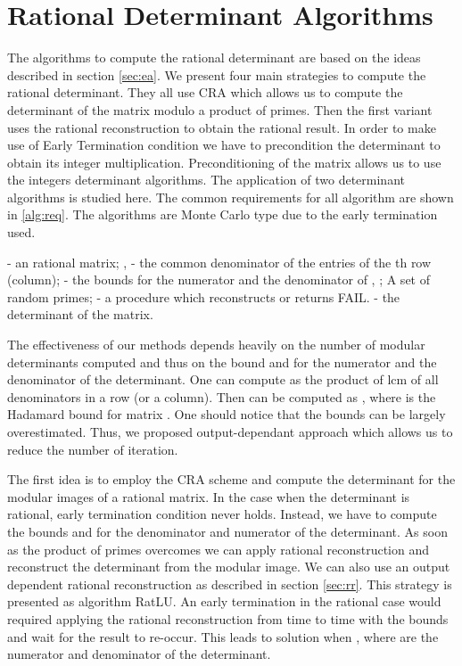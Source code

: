 \documentclass{acm_proc_article-sp}   \usepackage{graphicx,url}
\newcommand{\algrdRat}{RatLU}
\begin{document}
\section{Rational Determinant Algorithms}\label{sec:rda}




The algorithms to compute the rational determinant are based on the
ideas described in section \ref{sec:ea}. We present four main
strategies to compute the rational determinant. They all use CRA
which allows us to compute the determinant of the matrix modulo a
product  of primes. Then the first variant uses the
rational reconstruction to obtain the rational result. In order to
make use of Early Termination condition we have to precondition the
determinant to obtain its integer multiplication. Preconditioning of
the matrix allows us to use the integers determinant algorithms. The
application of two determinant algorithms is studied here. The
common requirements for all algorithm are shown in \ref{alg:req}.
The algorithms are Monte Carlo type due to the early termination
used.



\setcounter{algorithm}{-1}
\begin{algorithm}\caption{}\label{alg:req}
\begin{algorithmic}
\REQUIRE  - an  rational matrix; \REQUIRE ,
 - the common denominator of the entries of the th
row (column); \REQUIRE  - the bounds for the numerator and the
denominator of , ;
\REQUIRE A set  of random primes;
\REQUIRE  - a procedure which reconstructs  or returns FAIL.
\ENSURE  - the determinant of the matrix.
\end{algorithmic}
\end{algorithm}

 The effectiveness of our methods
depends heavily on the number of modular determinants computed and
thus on the bound  and  for the numerator and the denominator
of the determinant. One can compute  as the product of lcm of all
denominators in a row (or a column). Then  can be computed as
, where  is the Hadamard bound for matrix . One
should notice that the bounds can be largely overestimated. Thus, we
proposed output-dependant approach which allows us to reduce the
number of iteration.

The first idea is to employ the CRA scheme and compute the
determinant for the modular images of a rational matrix. In the case
when the determinant is rational, early termination condition never
holds. Instead, we have to compute the bounds  and  for the
denominator and numerator of the determinant.
As soon as the product of primes  overcomes  we can apply
rational reconstruction and reconstruct the determinant from the
modular image. We can also use an output dependent rational
reconstruction as described in section \ref{sec:rr}. This strategy is
presented as algorithm \algrdRat.  An early termination in the
rational case would required applying the rational reconstruction from
time to time with the bounds  and wait for the result
to re-occur. This leads to solution when ,
where  are the numerator and denominator of the determinant.
\end{document}
